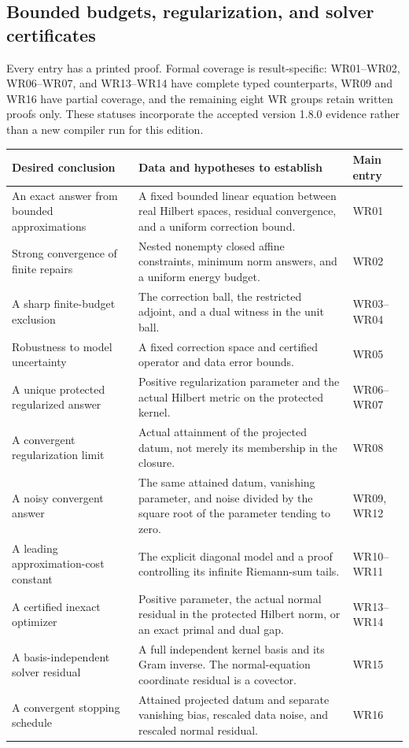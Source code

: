 \subsection{Bounded budgets, regularization, and solver certificates}
Every entry has a printed proof. Formal coverage is result-specific: WR01--WR02, WR06--WR07, and WR13--WR14 have complete typed counterparts, WR09 and WR16 have partial coverage, and the remaining eight WR groups retain written proofs only. These statuses incorporate the accepted version 1.8.0 evidence rather than a new compiler run for this edition.
\begin{longtable}{@{}p{.24\linewidth}p{.48\linewidth}p{.21\linewidth}@{}}
\toprule Desired conclusion & Data and hypotheses to establish & Main entry\\\midrule\endhead
An exact answer from bounded approximations & A fixed bounded linear equation between real Hilbert spaces, residual convergence, and a uniform correction bound. & WR01\\[4pt]
Strong convergence of finite repairs & Nested nonempty closed affine constraints, minimum norm answers, and a uniform energy budget. & WR02\\[4pt]
A sharp finite-budget exclusion & The correction ball, the restricted adjoint, and a dual witness in the unit ball. & WR03--WR04\\[4pt]
Robustness to model uncertainty & A fixed correction space and certified operator and data error bounds. & WR05\\[4pt]
A unique protected regularized answer & Positive regularization parameter and the actual Hilbert metric on the protected kernel. & WR06--WR07\\[4pt]
A convergent regularization limit & Actual attainment of the projected datum, not merely its membership in the closure. & WR08\\[4pt]
A noisy convergent answer & The same attained datum, vanishing parameter, and noise divided by the square root of the parameter tending to zero. & WR09, WR12\\[4pt]
A leading approximation-cost constant & The explicit diagonal model and a proof controlling its infinite Riemann-sum tails. & WR10--WR11\\[4pt]
A certified inexact optimizer & Positive parameter, the actual normal residual in the protected Hilbert norm, or an exact primal and dual gap. & WR13--WR14\\[4pt]
A basis-independent solver residual & A full independent kernel basis and its Gram inverse. The normal-equation coordinate residual is a covector. & WR15\\[4pt]
A convergent stopping schedule & Attained projected datum and separate vanishing bias, rescaled data noise, and rescaled normal residual. & WR16\\\bottomrule
\end{longtable}

